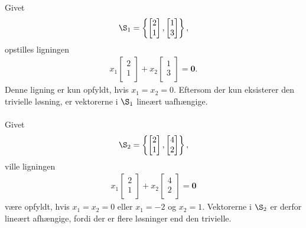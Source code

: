 \begin{eks}\label{fisk}
Givet
\begin{align*}
\S_1 =
\left\{ 
\begin{bmatrix}
           2 \\
           1 \\
\end{bmatrix} 
,
\begin{bmatrix}
           1 \\
           3 \\
\end{bmatrix}
\right\},
\end{align*}
opstilles ligningen  
%
\begin{align*}
x_1 
\begin{bmatrix}
           2 \\
           1 \\
\end{bmatrix} 
+ x_2
\begin{bmatrix}
           1 \\
           3 \\
\end{bmatrix}
= \mathbf{0}.
\end{align*}
%
Denne ligning er kun opfyldt, hvis $x_1=x_2=0$. 
Eftersom der kun eksisterer den trivielle løsning, er vektorerne i $\S_1$ lineært uafhængige.
\\\\
Givet
\begin{align*}
\S_2 =
\left\{ 
\begin{bmatrix}
           2 \\
           1 \\
\end{bmatrix} 
,
\begin{bmatrix}
           4 \\
           2 \\
\end{bmatrix}
\right\},
\end{align*}
%
ville ligningen 
%
\begin{align*}
x_1 
\begin{bmatrix}
           2 \\
           1 \\
\end{bmatrix} 
+ x_2
\begin{bmatrix}
           4 \\
           2 \\
\end{bmatrix}
= \mathbf{0}
\end{align*}
%
\newpage
\noindent
%
være opfyldt, hvis $x_1=x_2=0$ eller $x_1=-2$ og $x_2=1$. 
Vektorerne i $\S_2$ er derfor lineært afhængige, fordi der er flere løsninger end den trivielle.
%
\end{eks}
